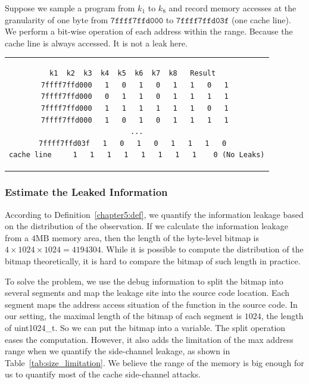 \begin{myexample}
Suppose we sample a program from $k_1$ to $k_8$ and record memory accesses at the granularity of one byte from $\mathtt{7ffff7ffd000}$ to $\mathtt{7ffff7ffd03f}$ (one cache line). We perform a bit-wise operation of each address within the range. Because the cache line is always accessed. It is not a leak here.
\begin{center}
  \begin{tabular}{c}
    {
      \begin{lstlisting}[frame=none]
              k1  k2  k3  k4  k5  k6  k7  k8   Result  
7ffff7ffd000   1   0   1   0   1   1   0   1 
7ffff7ffd000   0   1   1   0   1   1   1   1 
7ffff7ffd000   1   1   1   1   1   1   0   1 
7ffff7ffd000   1   0   1   0   1   1   1   1 
...
7ffff7ffd03f   1   0   1   0   1   1   1   0  
cache line     1   1   1   1   1   1   1   1    0 (No Leaks)
\end{lstlisting}
    }
  \end{tabular}
\end{center}
\end{myexample}

\subsubsection{Estimate the Leaked Information}
According to Definition~\ref{chapter5:def}, we quantify the information leakage based on the distribution of the observation. If we calculate the information leakage from a $4 \mathrm{MB}$ memory area, then the length of the byte-level bitmap is $4 \times 1024 \times 1024 = 4194304$. While it is possible to compute the distribution of the bitmap theoretically, it is hard to compare the bitmap of such length in practice.

To solve the problem, we use the debug information to split the bitmap into several segments and map the leakage site into the source code location. Each segment maps the address access situation of the function in the source code. In our setting, the maximal length of the bitmap of each segment is $1024$, the length of \textsf{uint1024\_t}. So we can put the bitmap into a variable. The split operation eases the computation. However, it also adds the limitation of the max address range when we quantify the side-channel leakage, as shown in Table~\ref{tab:size_limitation}. We believe the range of the memory is big enough for us to quantify most of the cache side-channel attacks.

\begin{table}[h]
  \centering
  \caption{The maximum range address range when we quantify the amount of the leakage with different granularity.}
  \label{tab:size_limitation}
\end{table}

